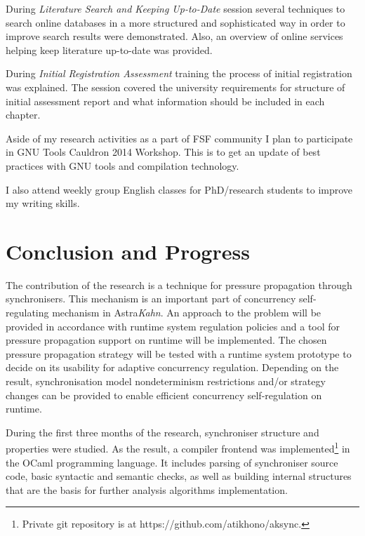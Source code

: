 \documentclass{article}
\begin{document}
During \emph{Literature Search and Keeping Up-to-Date} session several techniques to search online databases in a more structured and sophisticated way in order to improve search results were demonstrated. Also, an overview of online services helping keep literature up-to-date was provided.

During \emph{Initial Registration Assessment} training the process of initial registration was explained. The session covered the university requirements for structure of initial assessment report and what information should be included in each chapter.

Aside of my research activities as a part of FSF community I plan to participate in GNU Tools Cauldron 2014 Workshop. This is to get an update of best practices with GNU tools and compilation technology.

I also attend weekly group English classes for PhD/research students to improve my writing skills.

\section{Conclusion and Progress}
The contribution of the research is a technique for pressure propagation through synchronisers. This mechanism is an important part of concurrency self-regulating mechanism in Astra\emph{Kahn}. An approach to the problem will be provided in accordance with runtime system regulation policies and a tool for pressure propagation support on runtime will be implemented. The chosen pressure propagation strategy will be tested with a runtime system prototype to decide on its usability for adaptive concurrency regulation. Depending on the result, synchronisation model nondeterminism restrictions and/or strategy changes can be provided to enable efficient concurrency self-regulation on runtime.

During the first three months of the research, synchroniser structure and properties were studied. As the result, a compiler frontend was implemented\footnote{Private git repository is at https://github.com/atikhono/aksync.} in the OCaml programming language. It includes parsing of synchroniser source code, basic syntactic and semantic checks, as well as building internal structures that are the basis for further analysis algorithms implementation. 



\end{document}
